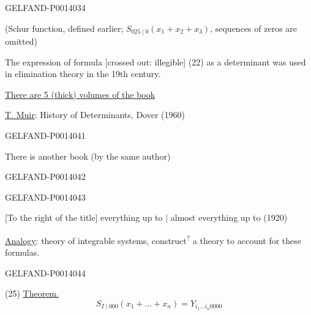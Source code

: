 \begin{GelfandAdjacentEvidence}{GELFAND-P001403}{4}


(Schur function, defined earlier; \(S_{025\mid 0}(x_1+x_2+x_3)\), sequences of zeros are omitted)

The expression of formula [crossed out:
illegible]
(22) as a determinant was used in elimination theory in the 19th century.

\end{GelfandAdjacentEvidence}



\uline{There are 5 (thick) volumes of the book}

\uline{T. Muir}: History of Determinants, Dover (1960)


\begin{GelfandAdjacentEvidence}{GELFAND-P001404}{1}

There is another book (by the same author)

\end{GelfandAdjacentEvidence}
\begin{GelfandAdjacentEvidence}{GELFAND-P001404}{2}


\end{GelfandAdjacentEvidence}
\begin{GelfandAdjacentEvidence}{GELFAND-P001404}{3}


[To the right of the title] everything up to  \(\vert\)
almost everything up to (1920)

\uline{Analogy}: theory of integrable systems,
construct\textsuperscript{?} a theory to account for these formulas.

\end{GelfandAdjacentEvidence}
\begin{GelfandAdjacentEvidence}{GELFAND-P001404}{4}



(25) \uline{Theorem.}
\[
S_{I\mid000}(x_1+\dots+x_n)=Y_{i_1\dots i_n0000}
\]
\end{GelfandAdjacentEvidence}
